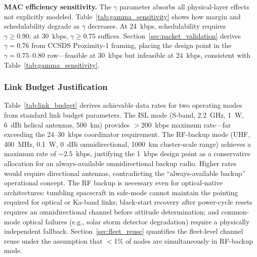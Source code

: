 \documentclass[journal]{IEEEtran}
\begin{document}
\textbf{MAC efficiency sensitivity.} The $\gamma$ parameter absorbs all physical-layer effects not explicitly modeled. Table~\ref{tab:gamma_sensitivity} shows how margin and schedulability degrade as $\gamma$ decreases. At 24~kbps, schedulability requires $\gamma \geq 0.90$; at 30~kbps, $\gamma \geq 0.75$ suffices. Section~\ref{sec:packet_validation} derives $\gamma = 0.76$ from CCSDS Proximity-1 framing, placing the design point in the $\gamma = 0.75$--$0.80$ row---feasible at 30~kbps but infeasible at 24~kbps, consistent with Table~\ref{tab:gamma_sensitivity}.

\subsubsection{Link Budget Justification}
\label{sec:link_budget}

Table~\ref{tab:link_budget} derives achievable data rates for two operating modes from standard link budget parameters. The ISL mode (S-band, 2.2~GHz, 1~W, 6~dBi helical antennas, 500~km) provides $>$200~kbps maximum rate---far exceeding the 24--30~kbps coordinator requirement. The RF-backup mode (UHF, 400~MHz, 0.1~W, 0~dBi omnidirectional, 1000~km cluster-scale range) achieves a maximum rate of ${\sim}2.5$~kbps, justifying the 1~kbps design point as a conservative allocation for an always-available omnidirectional backup radio. Higher rates would require directional antennas, contradicting the ``always-available backup'' operational concept. The RF backup is necessary even for optical-native architectures: tumbling spacecraft in safe-mode cannot maintain the pointing required for optical or Ka-band links; black-start recovery after power-cycle resets requires an omnidirectional channel before attitude determination; and common-mode optical failures (e.g., solar storm detector degradation) require a physically independent fallback. Section~\ref{sec:fleet_reuse} quantifies the fleet-level channel reuse under the assumption that $<$1\% of nodes are simultaneously in RF-backup mode.
\end{document}
